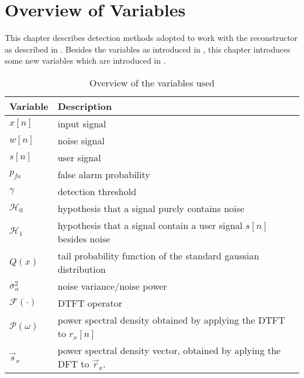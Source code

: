 \documentclass[a4paper, openany, oneside]{memoir}
\begin{document}
\section{Overview of Variables}
This chapter describes detection methods adopted to work with the reconstructor as described in . Besides the variables as introduced in , this chapter
 introduces some new variables which are introduced in . 

\begin{table}[H]
    \centering
    \begin{tabularx}{\textwidth}{lY}
        \textbf{Variable} & \textbf{Description}\\ \hline
        $x[n]$ & input signal \\
        $w[n]$& noise signal \\
        $s[n]$ & user signal \\
        $p_{fa}$ & false alarm probability  \\
        $\gamma$ & detection threshold \\
        $\mathcal{H}_0$ & hypothesis that a signal purely contains noise \\
        $\mathcal{H}_1$ & hypothesis that a signal contain a user signal $s[n]$ besides noise \\
        $Q(x)$ & tail probability function of the standard gaussian distribution \\
        $\sigma_n^2$ & noise variance/noise power \\
        $\mathcal{F}(\cdot)$ & DTFT operator \\
        $\mathcal{P}(\omega)$ & power spectral density obtained by applying the DTFT to $r_x[n]$\\
        $\vec{s}_x$ & power spectral density vector, obtained by aplying the DFT to $\vec{r}_x$.\\
    \end{tabularx}
    \caption{Overview of the variables used}
    \label{tab:detection-overview-variables}
\end{table}
\end{document}
